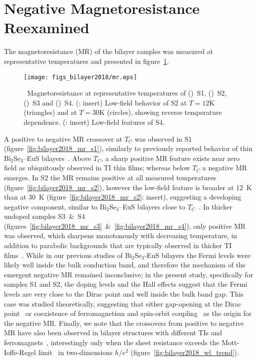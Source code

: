 \section{Negative Magnetoresistance Reexamined}
The magnetoresistance (MR) of the bilayer samples was measured at representative temperatures and presented in figure~\ref{fig:bilayer2018_mr}. %
%
\begin{figure}[ht]%
    \centering%
    \texttt{[image: figs\_bilayer2018/mr.eps]}%
    \subfloat{\label{fig:bilayer2018_mr_s1}}%
    \subfloat{\label{fig:bilayer2018_mr_s2}}%
    \subfloat{\label{fig:bilayer2018_mr_s3}}%
    \subfloat{\label{fig:bilayer2018_mr_s4}}%
    \caption[Magnetoresistance of (Bi$_{x}$Sb$_{1-x}$)$_2$Te$_3$--EuS bilayer samples]{\label{fig:bilayer2018_mr}~Magnetoresistance at representative temperatures of (\protect{})~S1, (\protect{})~S2, (\protect{})~S3 and (\protect{})~S4. (\protect{}: insert) Low-field behavior of S2 at $T = 12\mathrm{K}$ (triangles) and at $T = 30\mathrm{K}$ (circles), showing reverse temperature dependence. (\protect{}: insert) Low-field features of S4.}%
\end{figure}%
%
A positive to negative MR crossover at $T_C$ was observed in S1 (figure~\ref{fig:bilayer2018_mr_s1}), similarly to previously reported behavior of thin Bi$_2$Se$_3$--EuS bilayers~\cite{bilayer2014}. Above $T_C$, a sharp positive MR feature exists near zero field as ubiquitously observed in TI thin films; whereas below $T_C$ a negative MR emerges. In S2 the MR remains positive at all measured temperatures (figure~\ref{fig:bilayer2018_mr_s2}), however the low-field feature is broader at 12~K than at 30~K (figure~\ref{fig:bilayer2018_mr_s2}: insert), suggesting a developing negative component, similar to Bi$_2$Se$_3$--EuS bilayers close to $T_C$~\cite{bilayer2014}. In thicker undoped samples S3~\&~S4 (figures~\ref{fig:bilayer2018_mr_s3}~\&~\ref{fig:bilayer2018_mr_s4}), only positive MR was observed, which sharpens monotonously with decreasing temperature, in addition to parabolic backgrounds that are typically observed in thicker TI films~\cite{TI_WAL_thickness}. While in our previous studies of Bi$_2$Se$_3$-EuS bilayers the Fermi levels were likely well inside the bulk conduction band, and therefore the mechanism of the emergent negative MR remained inconclusive; in the present study, specifically for samples S1 and S2, the doping levels and the Hall effects suggest that the Fermi levels are very close to the Dirac point and well inside the bulk band gap. This case was studied theoretically, suggesting that either gap-opening at the Dirac point~\cite{WL_Glazman, WL_WAL_competition} or coexistence of ferromagnetism and spin-orbit coupling~\cite{WL_ferromagnetism} as the origin for the negative MR. Finally, we note that the crossovers from positive to negative MR have also been observed in bilayer structures with different TIs and ferromagnets~\cite{Samarth2017, Tian2016}, interestingly only when the sheet resistance exceeds the Mott-Ioffe-Regel limit~\cite{Mott_book, Fradkin1986b} in two-dimensions $h/e^2$ (figure~\ref{fig:bilayer2018_wl_trend}). %

